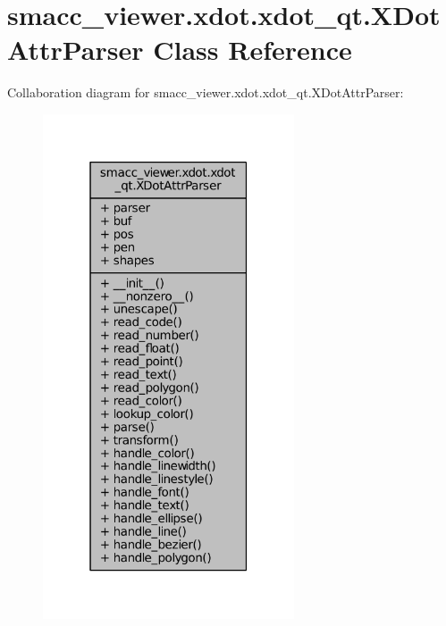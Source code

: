 \hypertarget{classsmacc__viewer_1_1xdot_1_1xdot__qt_1_1XDotAttrParser}{}\section{smacc\+\_\+viewer.\+xdot.\+xdot\+\_\+qt.\+X\+Dot\+Attr\+Parser Class Reference}
\label{classsmacc__viewer_1_1xdot_1_1xdot__qt_1_1XDotAttrParser}


Collaboration diagram for smacc\+\_\+viewer.\+xdot.\+xdot\+\_\+qt.\+X\+Dot\+Attr\+Parser\+:
\nopagebreak
\begin{figure}[H]
\begin{center}
\leavevmode
\includegraphics[width=211pt]{classsmacc__viewer_1_1xdot_1_1xdot__qt_1_1XDotAttrParser__coll__graph}
\end{center}
\end{figure}
